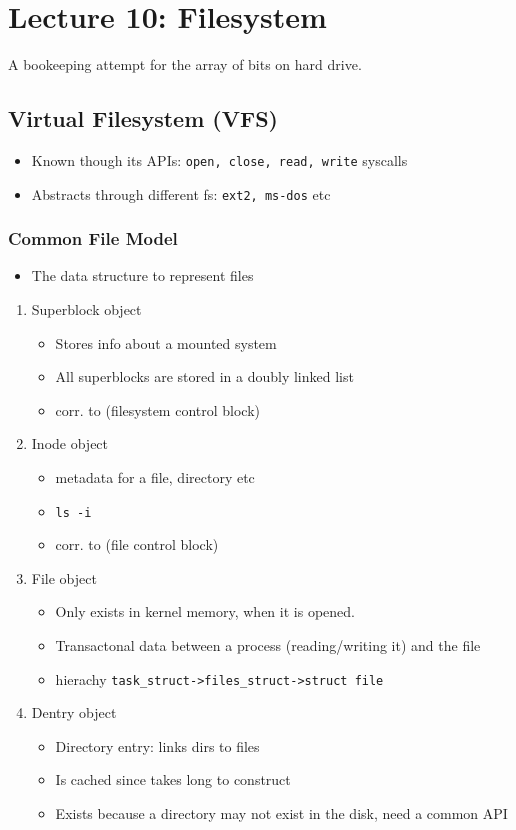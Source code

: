 \documentclass[11pt]{article}
\begin{document}
\section{Lecture 10: Filesystem}
\label{sec:orgfb22055}
A bookeeping attempt for the array of bits on hard drive.
\subsection{Virtual Filesystem (VFS)}
\label{sec:org21e301c}
\begin{itemize}
\item Known though its APIs: \texttt{open, close, read, write} syscalls
\item Abstracts through different fs: \texttt{ext2, ms-dos} etc
\end{itemize}
\subsubsection{Common File Model}
\label{sec:orgfd35be5}
\begin{itemize}
\item The data structure to represent files
\end{itemize}
\begin{enumerate}
\item Superblock object
\label{sec:org30d6e51}
\begin{itemize}
\item Stores info about a mounted system
\item All superblocks are stored in a doubly linked list
\item corr. to (filesystem control block)
\end{itemize}
\item Inode object
\label{sec:orge293454}
\begin{itemize}
\item metadata for a file, directory etc
\item \texttt{ls -i}
\item corr. to (file control block)
\end{itemize}
\item File object
\label{sec:orgced6044}
\begin{itemize}
\item Only exists in kernel memory, when it is opened.
\item Transactonal data between a process (reading/writing it) and the file
\item hierachy \texttt{task\_struct->files\_struct->struct file}
\end{itemize}
\item Dentry object
\label{sec:org4765319}
\begin{itemize}
\item Directory entry: links dirs to files
\item Is cached since takes long to construct
\item Exists because a directory may not exist in the disk, need a common API
\end{itemize}
\end{enumerate}
\end{document}
